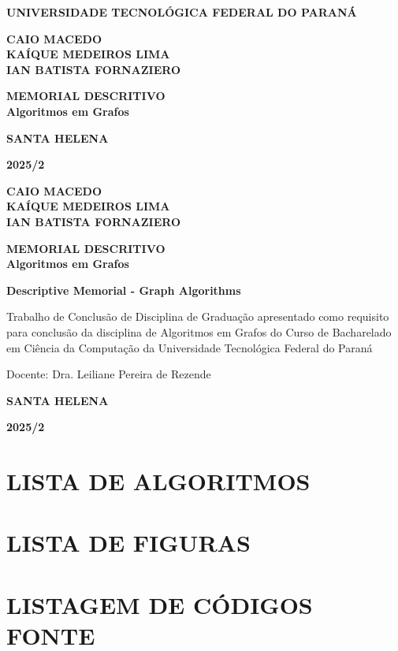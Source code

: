 \documentclass[
12pt,
a4paper,
semrecuonosumario,
sumario = abnt-6027-2012]{report}
\newcommand{\universidade}{UNIVERSIDADE TECNOLÓGICA FEDERAL DO PARANÁ}
\newcommand{\autores}{CAIO MACEDO\\ KAÍQUE MEDEIROS LIMA\\ IAN BATISTA FORNAZIERO}
\newcommand{\titulo}{MEMORIAL DESCRITIVO\\Algoritmos em Grafos}
\newcommand{\english}{Descriptive Memorial - Graph Algorithms}
\newcommand{\cidade}{SANTA HELENA}
\newcommand{\periodo}{2025/2}
\begin{document}
	
	\begin{titlepage}
		\centering
		{\bf \universidade\par}
		\vspace{4cm}
		{\bf\autores\par}
		\vspace{6cm}
		{\bf\titulo\par}
		\vspace{9cm}
		{\bf\cidade\par}
		{\bf\periodo\par}
		\newpage
		
		{\bf\autores\par}
		\vspace{3.5cm}
		{\bf\titulo\par}
		\vspace{2cm}
		{\bf\english\par}
		\vspace{3cm}
		\begin{flushright} %
			\begin{minipage}{0.5\textwidth} %
				\justifying %
				\noindent
				Trabalho de Conclusão de Disciplina de
				Graduação apresentado como requisito para
				conclusão da disciplina de Algoritmos em
				Grafos do Curso de Bacharelado em Ciência
				da Computação da Universidade Tecnológica
				Federal do Paraná
				
				\vspace{1em}
				\noindent
				Docente: Dra. Leiliane Pereira de Rezende
			\end{minipage}
		\end{flushright}
		\vspace{5cm}
		{\bf\cidade\par}
		{\bf\periodo\par}
		\thispagestyle{empty}
	\end{titlepage}
	\newpage
	\setcounter{page}{1}
	\section*{\centering \small\bfseries LISTA DE ALGORITMOS}
	
	\newpage
	\section*{\centering \small\bfseries LISTA DE FIGURAS}
	
	\newpage
	\section*{\centering \small\bfseries LISTAGEM DE CÓDIGOS FONTE}
	
\end{document}
